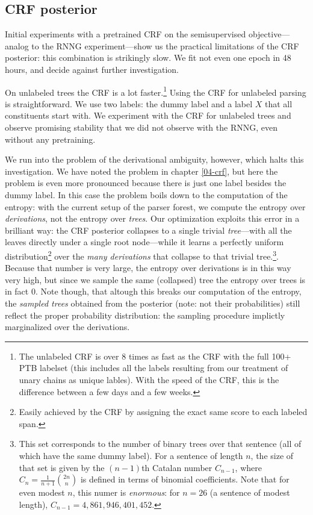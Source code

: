   \subsection{CRF posterior}
    Initial experiments with a pretrained CRF on the semisupervised objective---analog to the RNNG experiment---show us the practical limitations of the CRF posterior: this combination is strikingly slow. We fit not even one epoch in 48 hours, and decide against further investigation.

    On unlabeled trees the CRF is a lot faster.\footnote{The unlabeled CRF is over 8 times as fast as the CRF with the full 100+ PTB labelset (this includes all the labels resulting from our treatment of unary chains as unique lables). With the speed of the CRF, this is the difference between a few days and a few weeks.} Using the CRF for unlabeled parsing is straightforward. We use two labels: the dummy label and a label $X$ that all constituents start with. We experiment with the CRF for unlabeled trees and observe promising stability that we did not observe with the RNNG, even without any pretraining.

    We run into the problem of the derivational ambiguity, however, which halts this investigation. We have noted the problem in chapter \ref{04-crf}, but here the problem is even more pronounced because there is just one label besides the dummy label. In this case the problem boils down to the computation of the entropy: with the current setup of the parser forest, we compute the entropy over \textit{derivations}, not the entropy over \textit{trees}. Our optimization exploits this error in a brilliant way: the CRF posterior collapses to a single trivial \textit{tree}---with all the leaves directly under a single root node---while it learns a perfectly uniform distribution\footnote{Easily achieved by the CRF by assigning the exact same score to each labeled span.} over the \textit{many derivations} that collapse to that trivial tree.\footnote{This set corresponds to the number of binary trees over that sentence (all of which have the same dummy label). For a sentence of length $n$, the size of that set is given by the $(n-1)$th Catalan number $C_{n-1}$, where $C_n = \frac{1}{n+1} \binom{2n}{n}$ is defined in terms of binomial coefficients. Note that for even modest $n$, this numer is \textit{enormous}: for $n=26$  (a sentence of modest length), $C_{n-1} = 4,861,946,401,452$.}. Because that number is very large, the entropy over derivations is in this way very high, but since we sample the same (collapsed) tree the entropy over trees is in fact 0. Note though, that altough this breaks our computation of the entropy, the \textit{sampled trees} obtained from the posterior (note: not their probabilities) still reflect the proper probability distribution: the sampling procedure implictly marginalized over the derivations.

